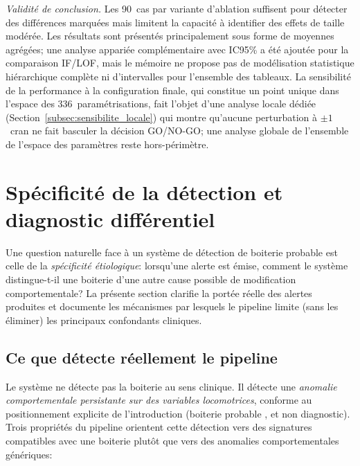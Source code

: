 \textit{Validité de conclusion.}
Les 90~cas par variante d'ablation suffisent pour détecter des différences marquées
mais limitent la capacité à identifier des effets de taille modérée. Les résultats sont
présentés principalement sous forme de moyennes agrégées; une analyse appariée
complémentaire avec IC95\% a été ajoutée pour la comparaison IF/LOF, mais le mémoire
ne propose pas de modélisation statistique hiérarchique complète ni d'intervalles pour
l'ensemble des tableaux. La sensibilité de la performance à la configuration finale,
qui constitue un point unique dans l'espace des 336~paramétrisations, fait l'objet
d'une analyse locale dédiée
(Section~\ref{subsec:sensibilite_locale}) qui montre qu'aucune perturbation à
$\pm 1$~cran ne fait basculer la décision GO/NO-GO; une analyse globale de l'ensemble
de l'espace des paramètres reste hors-périmètre.

\FloatBarrier
\section{Spécificité de la détection et diagnostic différentiel}
\label{sec:specificite_detection}

Une question naturelle face à un système de détection de boiterie probable est celle
de la \textit{spécificité étiologique}: lorsqu'une alerte est émise, comment le système
distingue-t-il une boiterie d'une autre cause possible de modification comportementale?
La présente section clarifie la portée réelle des alertes produites et documente les
mécanismes par lesquels le pipeline limite (sans les éliminer) les principaux
confondants cliniques.

\subsection{Ce que détecte réellement le pipeline}

Le système ne détecte pas la boiterie au sens clinique. Il détecte une
\textit{anomalie comportementale persistante sur des variables locomotrices}, conforme
au positionnement explicite de l'introduction (\og boiterie probable \fg{}, et non
diagnostic). Trois propriétés du pipeline orientent cette détection vers des signatures
compatibles avec une boiterie plutôt que vers des anomalies comportementales génériques:

